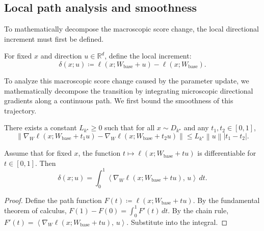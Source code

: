 \documentclass[bdcc,article,submit,pdftex]{Definitions/mdpi}
\newcommand{\R}{\mathbb{R}}
\newcommand{\ip}[2]{\left\langle #1,\,#2 \right\rangle}
\newcommand{\norm}[1]{\left\lVert #1 \right\rVert}
\newcommand{\tindex}{k^\star}
\newcommand{\utarget}{u}
\begin{document}
\subsection{Local path analysis and smoothness}

To mathematically decompose the macroscopic score change, the local directional increment must first be defined.

\begin{Definition}
\label{def:local_increment}
For fixed $x$ and direction $\utarget\in\R^d$, define the local increment:
\begin{equation}
\label{eq:local_increment}
\delta(x;\utarget)\coloneqq \ell(x;W_{\mathrm{base}}+\utarget)-\ell(x;W_{\mathrm{base}}).
\end{equation}
\end{Definition}

To analyze this macroscopic score change caused by the parameter update, we mathematically decompose the transition by integrating microscopic directional gradients along a continuous path. We first bound the smoothness of this trajectory.

\begin{Assumption}
\label{ass:smooth_path}
There exists a constant $L_{\tindex}\ge0$ such that for all $x\sim D_{\tindex}$ and any $t_1, t_2 \in [0, 1]$,
\[
\norm{\nabla_W \ell(x;W_{\mathrm{base}}+t_1 \utarget) - \nabla_W \ell(x;W_{\mathrm{base}}+t_2 \utarget)}
\le L_{\tindex} \norm{\utarget} |t_1-t_2|.
\]
\end{Assumption}

\begin{Lemma}
\label{lem:path}
Assume that for fixed $x$, the function $t\mapsto \ell(x;W_{\mathrm{base}}+t \utarget)$ is differentiable for $t\in[0,1]$.
Then
\begin{equation}
\label{eq:path}
\delta(x;\utarget)=\int_0^1 \ip{\nabla_W \ell(x;W_{\mathrm{base}}+t \utarget)}{\utarget}\,dt.
\end{equation}
\end{Lemma}

\begin{proof}
Define the path function $F(t)\coloneqq \ell(x;W_{\mathrm{base}}+t \utarget)$.
By the fundamental theorem of calculus, $F(1)-F(0)=\int_0^1 F'(t)\,dt$.
By the chain rule, $F'(t)=\ip{\nabla_W \ell(x;W_{\mathrm{base}}+t \utarget)}{\utarget}$.
Substitute into the integral.
\end{proof}
\end{document}
